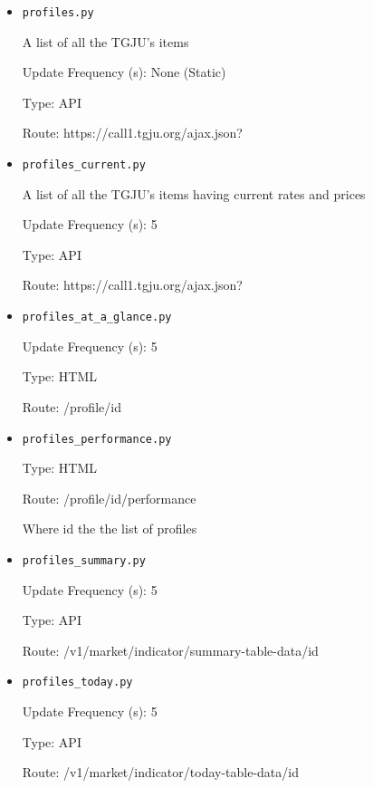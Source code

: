 {	\begin{itemize}
	  \item \texttt{profiles.py}

	  A list of all the TGJU's items

   		Update Frequency (s): None (Static)

	  Type: API

	  Route: https://call1.tgju.org/ajax.json?


	  \item \texttt{profiles\_current.py}

	  A list of all the TGJU's items having current rates and prices

	 Update Frequency (s): 5

	  Type: API

	  Route: https://call1.tgju.org/ajax.json?



	  \item \texttt{profiles\_at\_a\_glance.py}

	  Update Frequency (s): 5

	  Type: HTML

	  Route: /profile/{id}


	  \item \texttt{profiles\_performance.py}

	  Type: HTML

	  Route: /profile/{id}/performance

	  Where id the the list of profiles

	  \item \texttt{profiles\_summary.py}

		Update Frequency (s): 5

	  Type: API

	  Route: /v1/market/indicator/summary-table-data/{id}


	  \item \texttt{profiles\_today.py}

	  Update Frequency (s): 5

	  Type: API

	  Route: /v1/market/indicator/today-table-data/{id}


\end{itemize}}
